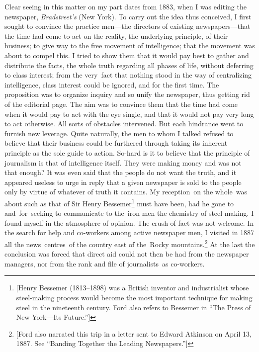 \documentclass[openany,nobib]{tufte-book}
\begin{document}
Clear seeing in this matter on my part dates from 1883, when I was
editing the newspaper, \emph{Bradstreet's} (New York). To carry out the
idea thus conceived, I first sought to convince the practice men---the
directors of existing newspapers---that the time had come to act on the
reality, the underlying principle, of their business; to give way to the
free movement of intelligence; that the movement was about to compel
this. I tried to show them that it would pay best to gather and
distribute the facts, the whole truth regarding all phases of life,
without deferring to class interest; from the very~fact that nothing
stood in the way of centralizing intelligence, class interest could be
ignored, and for the first time. The proposition was to organize inquiry
and so unify the newspaper, thus getting rid of the editorial page. The
aim was to convince them that the time had come when it would pay to act
with the eye single, and that it would not pay very long to act
otherwise. All sorts of obstacles intervened. But each hindrance went to
furnish new leverage. Quite naturally, the men to whom I talked refused
to believe that their business could be furthered through taking its
inherent principle as the sole guide to action. So-hard is it to believe
that the principle of journalism is that of intelligence itself. They
were making money and was not that enough? It was even said that the
people do not want the truth, and it appeared useless to urge in reply
that a given newspaper is sold to the people only by virtue of whatever
of truth it contains. My reception~on the whole~was about such as that
of Sir Henry Bessemer\footnote{{[}Henry Bessemer (1813--1898) was a
  British inventor and industrialist whose steel-making process would
  become the most important technique for making steel in the nineteenth
  century. Ford also refers to Bessemer in ``The Press of New York---Its
  Future.''{]}} must have been, had he gone to and~for~seeking to
communicate to the~iron men the chemistry of steel making. I found
myself in the atmosphere of opinion. The crush of fact was not welcome.
In the search for help and co-workers among active newspaper men, I
visited in 1887 all the news~centres~of the country east of the~Rocky
mountains.\footnote{{[}Ford also narrated this trip in a letter sent to
  Edward Atkinson on April 13, 1887. See ``Banding Together the Leading
  Newspapers.''{]}} At the last the conclusion was forced that direct
aid could not then be had from the newspaper managers, nor from the rank
and file of journalists~as co-workers.~
\end{document}
